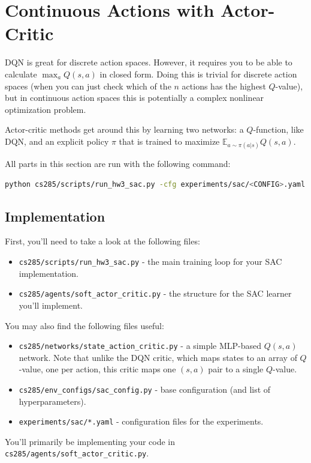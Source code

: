 \section{Continuous Actions with Actor-Critic}
DQN is great for discrete action spaces. However, it requires you to be able to calculate $\max_a Q(s, a)$ in closed form. Doing this is trivial for discrete action spaces (when you can just check which of the $n$ actions has the highest $Q$-value), but in continuous action spaces this is potentially a complex nonlinear optimization problem.

Actor-critic methods get around this by learning two networks: a $Q$-function, like DQN, and an explicit policy $\pi$ that is trained to maximize $\mathbb{E}_{a \sim \pi(a|s)} Q(s, a)$.

All parts in this section are run with the following command:
\begin{lstlisting}[language=bash,breaklines=true]
  python cs285/scripts/run_hw3_sac.py -cfg experiments/sac/<CONFIG>.yaml
\end{lstlisting}

\subsection{Implementation}
First, you'll need to take a look at the following files:
\begin{itemize}
    \item \verb|cs285/scripts/run_hw3_sac.py| - the main training loop for your SAC implementation.
    \item \verb|cs285/agents/soft_actor_critic.py| - the structure for the SAC learner you'll implement.
\end{itemize}
You may also find the following files useful:
\begin{itemize}
    \item \verb|cs285/networks/state_action_critic.py| - a simple MLP-based $Q(s, a)$ network. Note that unlike the DQN critic, which maps states to an array of $Q$-value, one per action, this critic maps one $(s, a)$ pair to a single $Q$-value.
    \item \verb|cs285/env_configs/sac_config.py| - base configuration (and list of hyperparameters).
    \item \verb|experiments/sac/*.yaml| - configuration files for the experiments.
\end{itemize}

You'll primarily be implementing your code in \verb|cs285/agents/soft_actor_critic.py|.

